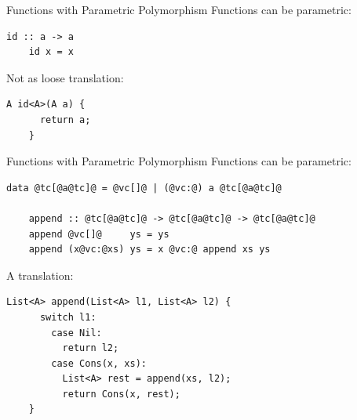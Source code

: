 \documentclass[xcolor={usenames,dvipsnames}]{beamer}
\begin{document}
%

\begin{frame}[fragile]{Functions with Parametric Polymorphism}
  Functions can be parametric:
  \begin{lstlisting}[style=hask]
    id :: a -> a
    id x = x
  \end{lstlisting}

  \pause
  Not as loose translation:
  \begin{lstlisting}[style=hask]
    A id<A>(A a) {
      return a;
    }
  \end{lstlisting}
\end{frame}

\begin{frame}[fragile]{Functions with Parametric Polymorphism}
  Functions can be parametric:
  \begin{lstlisting}[style=hask]
    data @tc[@a@tc]@ = @vc[]@ | (@vc:@) a @tc[@a@tc]@

    append :: @tc[@a@tc]@ -> @tc[@a@tc]@ -> @tc[@a@tc]@
    append @vc[]@     ys = ys
    append (x@vc:@xs) ys = x @vc:@ append xs ys
  \end{lstlisting}

  \pause
  A translation:
  \begin{lstlisting}[style=hask]
    List<A> append(List<A> l1, List<A> l2) {
      switch l1:
        case Nil:
          return l2;
        case Cons(x, xs):
          List<A> rest = append(xs, l2);
          return Cons(x, rest);
    }
  \end{lstlisting}
\end{frame}
\end{document}
